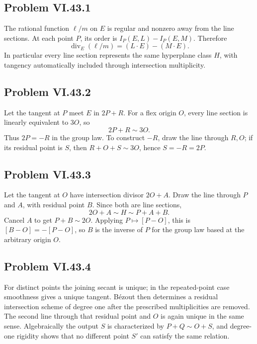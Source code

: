 \subsection*{Problem VI.43.1}
\begin{solution}
The rational function \(\ell/m\) on \(E\) is regular and nonzero away from the line sections.  At each point \(P\), its order is \(I_P(E,L)-I_P(E,M)\).  Therefore
\[
\operatorname{div}_E(\ell/m)=(L\cdot E)-(M\cdot E).
\]
In particular every line section represents the same hyperplane class \(H\), with tangency automatically included through intersection multiplicity.
\end{solution}

\subsection*{Problem VI.43.2}
\begin{solution}
Let the tangent at \(P\) meet \(E\) in \(2P+R\).  For a flex origin \(O\), every line section is linearly equivalent to \(3O\), so
\[
2P+R\sim3O.
\]
Thus \(2P=-R\) in the group law.  To construct \(-R\), draw the line through \(R,O\); if its residual point is \(S\), then \(R+O+S\sim3O\), hence \(S=-R=2P\).
\end{solution}

\subsection*{Problem VI.43.3}
\begin{solution}
Let the tangent at \(O\) have intersection divisor \(2O+A\).  Draw the line through \(P\) and \(A\), with residual point \(B\).  Since both are line sections,
\[
2O+A\sim H\sim P+A+B.
\]
Cancel \(A\) to get \(P+B\sim2O\).  Applying \(P\mapsto[P-O]\), this is \([B-O]=-[P-O]\), so \(B\) is the inverse of \(P\) for the group law based at the arbitrary origin \(O\).
\end{solution}

\subsection*{Problem VI.43.4}
\begin{solution}
For distinct points the joining secant is unique; in the repeated-point case smoothness gives a unique tangent.  Bézout then determines a residual intersection scheme of degree one after the prescribed multiplicities are removed.  The second line through that residual point and \(O\) is again unique in the same sense.  Algebraically the output \(S\) is characterized by \(P+Q\sim O+S\), and degree-one rigidity shows that no different point \(S'\) can satisfy the same relation.
\end{solution}

